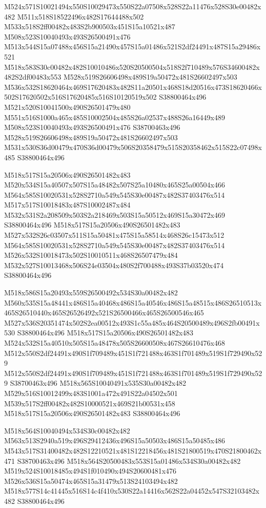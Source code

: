 \documentclass{article}
\begin{document}
\begin{multicols}{2}
M524x571S10021494x550S10029473x550S22a07508x528S22a11476x528S30e00482x482 M511x518S18522496x482S17644488x502 M533x518S2ff00482x483S2b900503x451S15a10521x487 M508x523S10040493x493S26500491x476 M513x544S15a07488x456S15a21490x457S15a01486x521S2df24491x487S15a29486x521 M518x583S30c00482x482S10010486x520S20500504x518S2f710489x576S34600482x482S2df00483x553 M528x519S26606498x489S19a50472x481S26602497x503 M536x532S18620464x469S17620483x482S11a20501x468S18d20516x473S18620466x502S17620502x516S17620485x516S10120519x502 S38800464x496 M521x520S10041500x490S26501479x480 M551x516S1000a465x485S10002504x485S26a02537x488S26a16449x489 M508x523S10040493x493S26500491x476 S38700463x496 M528x519S26606498x489S19a50472x481S26602497x503 M531x530S36d00479x470S36d00479x506S20358479x515S20358462x515S22c07498x485 S38800464x496

M518x517S15a20506x490S26501482x483 M520x534S15a40507x507S15a48482x507S25a10480x465S25a00504x466 M564x585S10020531x528S2710a549x545S30e00487x482S37403476x514 M517x517S10018483x487S10002487x484 M532x531S2a208509x503S2a218469x503S15a50512x469S15a30472x469 S38800464x496 M518x517S15a20506x490S26501482x483 M527x532S26c03507x511S15a50481x475S15a58514x468S26c15473x512 M564x585S10020531x528S2710a549x545S30e00487x482S37403476x514 M526x532S10018473x502S10010511x468S26507479x484 M532x527S10013468x506S24e03504x480S2f700488x493S37b03520x474 S38800464x496

M518x586S15a20493x559S26500492x534S30a00482x482 M560x535S15a48441x486S15a40468x486S15a40546x486S15a48515x486S26510513x465S26510440x465S26526492x521S26500466x465S26500546x465 M527x536S20351474x502S2ea00512x493S1c55a485x464S20500489x496S2fb00491x530 S38800464x496 M518x517S15a20506x490S26501482x483 M524x532S15a40510x505S15a48478x505S26600508x467S26610476x468 M512x550S2df24491x490S1f709489x451S1f721488x463S1f701489x519S1f729490x529 M512x550S2df24491x490S1f709489x451S1f721488x463S1f701489x519S1f729490x529 S38700463x496 M518x565S10040491x535S30a00482x482 M529x516S10012499x483S1001a472x491S22a04502x501 M539x517S2ff00482x482S10000521x469S21b00531x458 M518x517S15a20506x490S26501482x483 S38800464x496

M518x564S10040494x534S30c00482x482 M563x513S2940a519x496S29412436x496S15a50503x486S15a50485x486 M543x517S31400482x482S12210521x481S12218456x481S21800519x470S21800462x471 S38700463x496 M518x564S20500483x553S15a01486x534S30a00482x482 M519x524S10018485x494S1f010490x494S20600481x476 M526x536S15a50474x465S15a31479x513S24103494x482 M518x577S14c41445x516S14c4f410x530S22a14416x562S22a04452x547S32103482x482 S38800464x496


\end{multicols}
\end{document}

